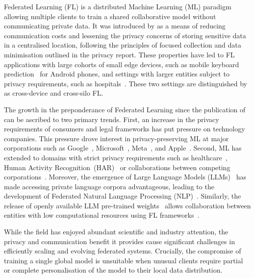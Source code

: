 
Federated Learning (FL) is a distributed Machine Learning (ML) paradigm allowing multiple clients to train a shared collaborative model without communicating private data. It was introduced by \citet{FedAvg} as a means of reducing communication costs and lessening the privacy concerns of storing sensitive data in a centralised location, following the principles of focused collection and data minimisation outlined in the \citet{White_House_Report} privacy report. These properties have led to FL applications with large cohorts of small edge devices, such as mobile keyboard prediction~\citep{GoogleKeyboard} for Android phones, and settings with larger entities subject to privacy requirements, such as hospitals~\citep{FLmedicine}. These two settings are distinguished by \citet{AdvancedAndOpenProblems} as cross-device and cross-silo FL\@.

The growth in the preponderance of Federated Learning since the publication of \citet{FedAvg} can be ascribed to two primary trends. First, an increase in the privacy requirements of consumers and legal frameworks has put pressure on technology companies. This pressure drove interest in privacy-preserving ML at major corporations such as Google~\citep{FedAvg,GoogleKeyboard,tensorflowfederated,PracticalPrivateFLkairouz21b}, Microsoft~\citep{FLINT,Flute}, Meta~\citep{PAPAYA,FedBuff}, and Apple~\citep{AppleFL}. Second, ML has extended to domains with strict privacy requirements such as healthcare~\citep{FLmedicine,FutureOfHealth,BigDataCancer}, Human Activity Recognition~(HAR)~\citep{HARusingFL_2018,ClusterFL} or collaborations between competing corporations~\citep{SustainableIncentive,TowardsFairPrivacyPreservingFL}. Moreover, the emergence of Large Language Models (LLMs)~\citep{OpportunitiesAndRisksLLM} has made accessing private language corpora advantageous, leading to the development of Federated Natural Language Processing (NLP)~\citep{FedNLP}. Similarly, the release of openly available LLM pre-trained weights~\citep{LLaMA} allows collaboration between entities with low computational resources using FL frameworks~\citep{Flower,FedScale,FedML}.

While the field has enjoyed abundant scientific and industry attention, the privacy and communication benefit it provides cause significant challenges in efficiently scaling and evolving federated systems. Crucially, the compromise of training a single global model is unsuitable when unusual clients require partial or complete personalisation of the model to their local data distribution.


